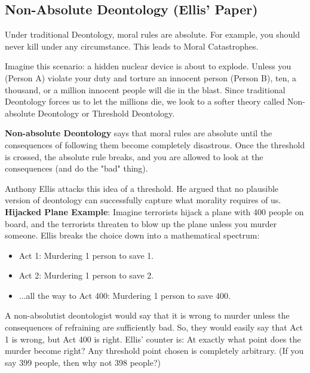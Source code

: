\documentclass[12pt]{article}
\begin{document}
\subsection{Non-Absolute Deontology (Ellis’ Paper)}
Under traditional Deontology, moral rules are absolute. For example, you should never kill under any circumstance.
This leads to Moral Catastrophes.

\noindent Imagine this scenario: a hidden nuclear device is about to explode. Unless you (Person A) violate your duty and torture an innocent person (Person B), ten, a thousand, or a million innocent people will die in the blast.
Since traditional Deontology forces us to let the millions die, we look to a softer theory called Non-absolute Deontology or Threshold Deontology.

\noindent\textbf{Non-absolute Deontology} says that moral rules are absolute until the consequences of following them become completely disastrous.
Once the threshold is crossed, the absolute rule breaks, and you are allowed to look at the consequences (and do the "bad" thing).

Anthony Ellis attacks this idea of a threshold. He argued that no plausible version of deontology can successfully capture what morality requires of us.
\textbf{Hijacked Plane Example}: Imagine terrorists hijack a plane with 400 people on board, and the terrorists threaten to blow up the plane unless you murder someone.
Ellis breaks the choice down into a mathematical spectrum:
\begin{itemize}
    \item Act 1: Murdering 1 person to save 1.
    \item Act 2: Murdering 1 person to save 2.
    \item ...all the way to Act 400: Murdering 1 person to save 400.
\end{itemize}
A non-absolutist deontologist would say that it is wrong to murder unless the consequences of refraining are sufficiently bad. So, they would easily say that Act 1 is wrong, but Act 400 is right.
Ellis' counter is: At exactly what point does the murder become right?
Any threshold point chosen is completely arbitrary. (If you say 399 people, then why not 398 people?)
\end{document}
